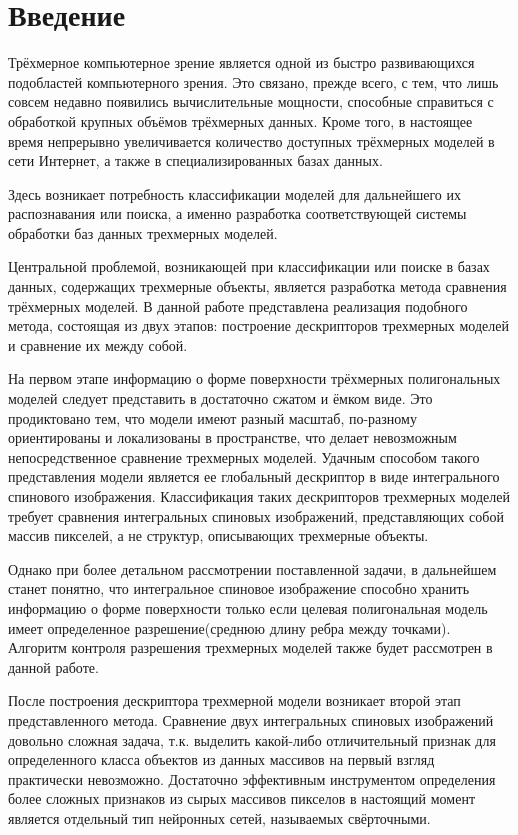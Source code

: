 \documentclass[14pt]{article}
\numberwithin{figure}{section}
\numberwithin{equation}{section}
\begin{document}
\newpage

\section*{Введение}

Трёхмерное компьютерное зрение является одной из быстро развивающихся подобластей компьютерного зрения. Это связано, прежде всего, с тем, что лишь совсем недавно появились вычислительные мощности, способные справиться с обработкой крупных объёмов трёхмерных данных. Кроме того, в настоящее время непрерывно увеличивается количество доступных трёхмерных моделей в сети Интернет, а также в специализированных базах данных.

Здесь возникает потребность классификации моделей для дальнейшего их распознавания или поиска, а именно разработка соответствующей системы обработки баз данных трехмерных моделей.

Центральной проблемой, возникающей при классификации или поиске в базах данных, содержащих трехмерные объекты, является разработка метода сравнения трёхмерных моделей. В данной работе представлена реализация подобного метода, состоящая из двух этапов: построение дескрипторов трехмерных моделей и сравнение их между собой.

На первом этапе информацию о форме поверхности трёхмерных полигональных моделей следует представить в достаточно сжатом и ёмком виде. Это продиктовано тем, что модели имеют разный масштаб, по-разному ориентированы и локализованы в пространстве, что делает невозможным непосредственное сравнение трехмерных моделей. Удачным способом такого представления модели является ее глобальный дескриптор в виде интегрального спинового изображения. Классификация таких дескрипторов трехмерных моделей требует сравнения интегральных спиновых изображений, представляющих собой массив пикселей, а не структур, описывающих трехмерные объекты.

Однако при более детальном рассмотрении поставленной задачи, в дальнейшем станет понятно, что интегральное спиновое изображение способно хранить информацию о форме поверхности только если целевая полигональная модель имеет определенное разрешение(среднюю длину ребра между точками). Алгоритм контроля разрешения трехмерных моделей также будет рассмотрен в данной работе.

После построения дескриптора трехмерной модели возникает второй этап представленного метода. Сравнение двух интегральных спиновых изображений довольно сложная задача, т.к. выделить какой-либо отличительный признак для определенного класса объектов из данных массивов на первый взгляд практически невозможно. Достаточно эффективным инструментом определения более сложных признаков из сырых массивов пикселов в настоящий момент является отдельный тип нейронных сетей, называемых свёрточными.
\end{document}
